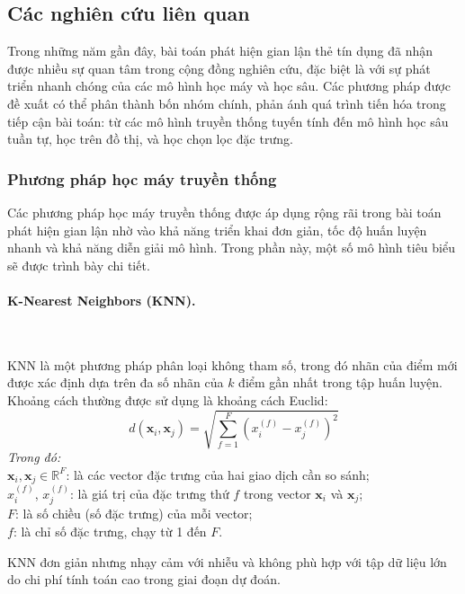 \subsection{Các nghiên cứu liên quan}

Trong những năm gần đây, bài toán phát hiện gian lận thẻ tín dụng đã nhận được nhiều sự quan tâm trong cộng đồng nghiên cứu, đặc biệt là với sự phát triển nhanh chóng của các mô hình học máy và học sâu. Các phương pháp được đề xuất có thể phân thành bốn nhóm chính, phản ánh quá trình tiến hóa trong tiếp cận bài toán: từ các mô hình truyền thống tuyến tính đến mô hình học sâu tuần tự, học trên đồ thị, và học chọn lọc đặc trưng.

\subsubsection{Phương pháp học máy truyền thống}

Các phương pháp học máy truyền thống được áp dụng rộng rãi trong bài toán phát hiện gian lận nhờ vào khả năng triển khai đơn giản, tốc độ huấn luyện nhanh và khả năng diễn giải mô hình. Trong phần này, một số mô hình tiêu biểu sẽ được trình bày chi tiết.

\paragraph{K-Nearest Neighbors (KNN).}~

\vspace{0.5em}

KNN là một phương pháp phân loại không tham số, trong đó nhãn của điểm mới được xác định dựa trên đa số nhãn của $k$ điểm gần nhất trong tập huấn luyện. Khoảng cách thường được sử dụng là khoảng cách Euclid:
\[
d(\mathbf{x}_i, \mathbf{x}_j) = \sqrt{ \sum_{f=1}^{F} \left( x_i^{(f)} - x_j^{(f)} \right)^2 }
\]
\textit{Trong đó:} \\
$\mathbf{x}_i, \mathbf{x}_j \in \mathbb{R}^F$: là các vector đặc trưng của hai giao dịch cần so sánh; \\
$x_i^{(f)}$, $x_j^{(f)}$: là giá trị của đặc trưng thứ $f$ trong vector $\mathbf{x}_i$ và $\mathbf{x}_j$; \\
$F$: là số chiều (số đặc trưng) của mỗi vector; \\
$f$: là chỉ số đặc trưng, chạy từ 1 đến $F$.

KNN đơn giản nhưng nhạy cảm với nhiễu và không phù hợp với tập dữ liệu lớn do chi phí tính toán cao trong giai đoạn dự đoán.

